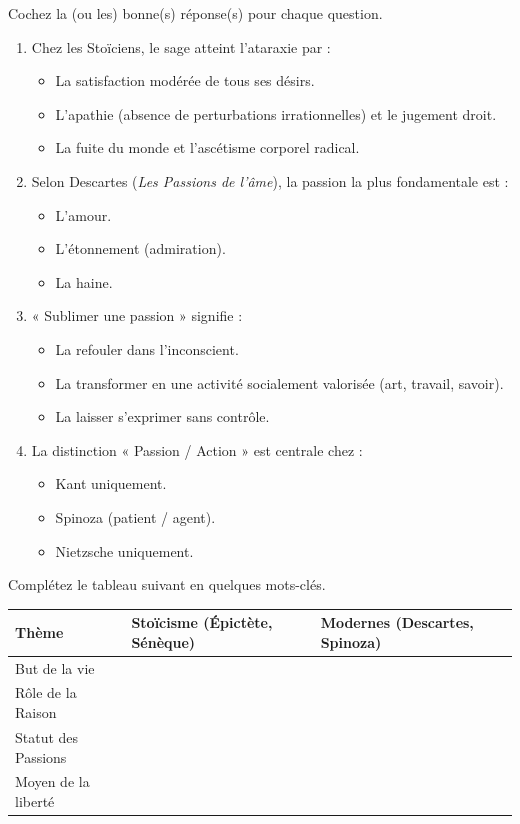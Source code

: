 \documentclass[11pt]{article}
\begin{document}
\begin{exercice}
Cochez la (ou les) bonne(s) réponse(s) pour chaque question.
\begin{enumerate}
    \item Chez les Stoïciens, le sage atteint l'ataraxie par :
    \begin{itemize}
        \item[A.] La satisfaction modérée de tous ses désirs.
        \item[B.] L'apathie (absence de perturbations irrationnelles) et le jugement droit.
        \item[C.] La fuite du monde et l'ascétisme corporel radical.
    \end{itemize}
    \item Selon Descartes (\textit{Les Passions de l'âme}), la passion la plus fondamentale est :
    \begin{itemize}
        \item[A.] L'amour.
        \item[B.] L'étonnement (admiration).
        \item[C.] La haine.
    \end{itemize}
    \item « Sublimer une passion » signifie :
    \begin{itemize}
        \item[A.] La refouler dans l'inconscient.
        \item[B.] La transformer en une activité socialement valorisée (art, travail, savoir).
        \item[C.] La laisser s'exprimer sans contrôle.
    \end{itemize}
    \item La distinction « Passion / Action » est centrale chez :
    \begin{itemize}
        \item[A.] Kant uniquement.
        \item[B.] Spinoza (patient / agent).
        \item[C.] Nietzsche uniquement.
    \end{itemize}
\end{enumerate}
\end{exercice}

\begin{exercice}
Complétez le tableau suivant en quelques mots-clés.
\begin{center}
\begin{tabular}{|p{3.5cm}|p{5.5cm}|p{5.5cm}|}
\hline
\textbf{Thème} & \textbf{Stoïcisme (Épictète, Sénèque)} & \textbf{Modernes (Descartes, Spinoza)} \\ \hline
But de la vie & & \\ \hline
Rôle de la Raison & & \\ \hline
Statut des Passions & & \\ \hline
Moyen de la liberté & & \\ \hline
\end{tabular}
\end{center}
\end{exercice}
\end{document}
